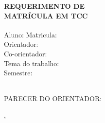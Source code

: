 \documentclass[a4paper]{paper}
\begin{document}
{\center \Huge \bf REQUERIMENTO DE
\\ MATRÍCULA EM TCC
}
\\
\\
Aluno: \dotuline{\student} \dotfill Matricula: \dotuline{\studentid} \dotfill \\
Orientador: \dotuline{\advisorName} \dotfill\\
Co-orientador: \dotuline{\coadvisorName} \dotfill\\
Tema do trabalho: \dotuline{\thesisTitle}\dotfill \\
Semestre: \dotuline{\semester} \dotfill
\\
\\
\demands

PARECER DO ORIENTADOR: 
\dotcolumnfill

\local, \dateRequirement

\end{document}

